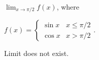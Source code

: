 {$\displaystyle \lim_{x\to \pi/2} f(x)$, where 

$f(x) = \left\{\begin{array}{cl} \sin x & x\leq \pi/2 \\ \cos x & x>\pi/2 \end{array}\right.$.}
{Limit does not exist.}




